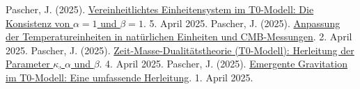 \documentclass[a4paper,12pt]{article}
\begin{document}
\begin{thebibliography}{99}
		 Pascher, J. (2025). \href{https://github.com/jpascher/T0-Time-Mass-Duality/tree/main/2/pdf/Deutsch/Alpha1Beta1Konsistenz.pdf}{Vereinheitlichtes Einheitensystem im T0-Modell: Die Konsistenz von \(\alpha = 1\) und \(\beta = 1\)}. 5. April 2025.
		 Pascher, J. (2025). \href{https://github.com/jpascher/T0-Time-Mass-Duality/tree/main/2/pdf/Deutsch/NatEinheitenAlpha1.pdf}{Anpassung der Temperatureinheiten in natürlichen Einheiten und CMB-Messungen}. 2. April 2025.
		 Pascher, J. (2025). \href{https://github.com/jpascher/T0-Time-Mass-Duality/tree/main/2/pdf/Deutsch/ZeitMasseT0Params.pdf}{Zeit-Masse-Dualitätstheorie (T0-Modell): Herleitung der Parameter \(\kappa\), \(\alpha\) und \(\beta\)}. 4. April 2025.
		 Pascher, J. (2025). \href{https://github.com/jpascher/T0-Time-Mass-Duality/tree/main/2/pdf/Deutsch/EmergentGravT0.pdf}{Emergente Gravitation im T0-Modell: Eine umfassende Herleitung}. 1. April 2025.
	\end{thebibliography}
	
\end{document}
